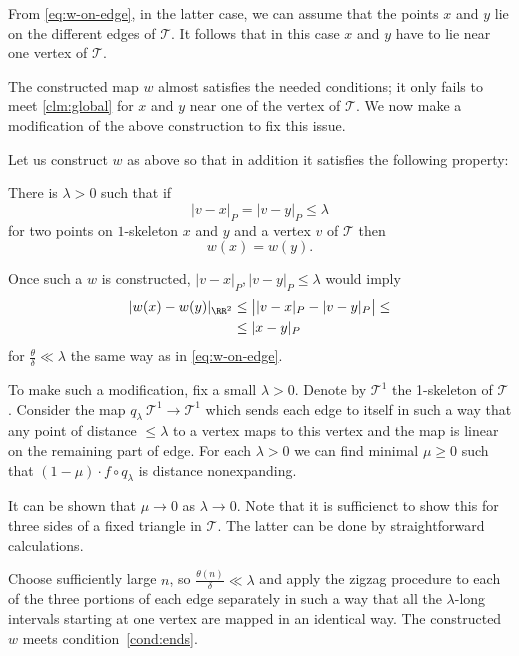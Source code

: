 From \ref{eq:w-on-edge}, in the latter case, we can assume that the points $x$ and $y$ lie on the different edges of $\mathcal{T}$.
It follows that in this case $x$ and $y$ have to lie near one vertex of $\mathcal{T}$.

\medskip

The constructed map $w$ almost satisfies the needed conditions;
it only fails to meet \ref{clm:global} for $x$ and $y$ 
near one of the vertex of $\mathcal{T}$.
We now make a modification of the above construction to fix this issue.

 Let us construct $w$ as above
 so that in addition it satisfies the following property:
\begin{clm}{}\label{cond:ends}
There is $\lambda>0$ such that 
if
$$|v-x|_P=|v-y|_P \leq \lambda$$
 for two points on $1$-skeleton $x$ and $y$ and a vertex $v$ of $\mathcal{T}$ then
$$w(x)=w(y).$$

\end{clm}
Once such a $w$ is  constructed, $|v-x|_P,|v-y|_P\le \lambda$
 would  imply 
\begin{align*}
 |w(x)-w(y)|_{\RR^2}
&\le \bigl||v-x|_P-|v-y|_P\bigr|\le
\\
&\le|x-y|_P
\end{align*}
for $\tfrac\theta\delta\ll\lambda$ the same way as in \ref{eq:w-on-edge}.

To make such a modification,
fix a small $\lambda > 0$.
Denote by $\mathcal{T}^1$ the 1-skeleton of $\mathcal{T}$.
Consider the map $q_\lambda\:\mathcal{T}^1\to\mathcal{T}^1$ which sends each edge to itself 
in such a way that any point of distance $\le\lambda$ to a vertex maps to this vertex 
and the map is linear on the remaining part of edge.
For each $\lambda>0$ we can find minimal $\mu\ge 0$ such that 
$(1-\mu)\cdot f\circ q_\lambda$ is distance nonexpanding.

It can be shown that $\mu\to0$ as $\lambda\to 0$.
Note that it is sufficienct to show this for three sides of a fixed triangle in $\mathcal{T}$.
The latter can be done by straightforward calculations.

Choose sufficiently large $n$, so $\tfrac{\theta(n)}\delta\ll\lambda$
and apply the zigzag procedure to each of the three portions of each edge separately in such a way that all the $\lambda$-long intervals starting at one vertex are mapped in an identical way.
The constructed $w$ meets condition~\ref{cond:ends}.











